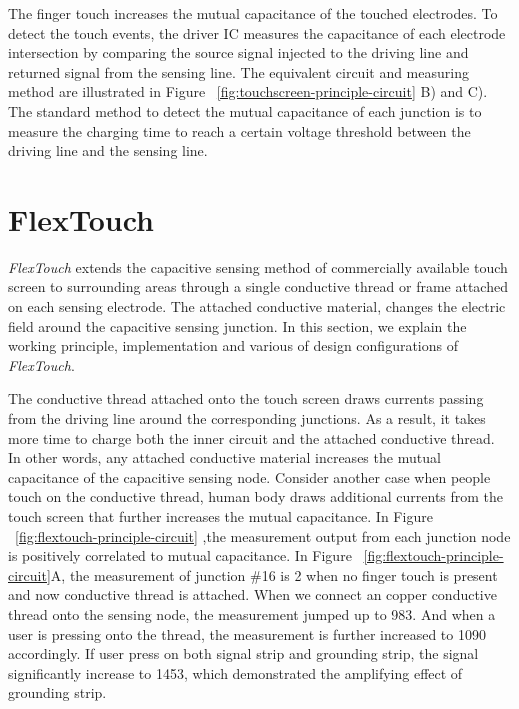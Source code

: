 The finger touch increases the mutual capacitance of the touched electrodes. To detect the touch events, the driver IC measures the capacitance of each electrode intersection by comparing the source signal injected to the driving line and returned signal from the sensing line. The equivalent circuit and measuring method are illustrated in Figure ~\ref{fig:touchscreen-principle-circuit} B) and C). The standard method to detect the mutual capacitance of each junction is to measure the charging time to reach a certain voltage threshold between the driving line and the sensing line. 

\section{FlexTouch}

\textit{FlexTouch} extends the capacitive sensing method of commercially available touch screen to surrounding areas through a single conductive thread or frame attached on each sensing electrode. The attached conductive material, changes the electric field around the capacitive sensing junction. In this section, we explain the working principle, implementation and various of design configurations of \textit{FlexTouch}.

The conductive thread attached onto the touch screen draws currents passing from the driving line around the corresponding junctions. As a result, it takes more time to charge both the inner circuit and the attached conductive thread. In other words, any attached conductive material increases the mutual capacitance of the capacitive sensing node. Consider another case when people touch on the conductive thread, human body draws additional currents from the touch screen that further increases the mutual capacitance. In Figure ~\ref{fig:flextouch-principle-circuit} ,the measurement output from each junction node is positively correlated to mutual capacitance. In Figure  ~\ref{fig:flextouch-principle-circuit}A, the measurement of junction \#16 is 2 when no finger touch is present and now conductive thread is attached. When we connect an copper conductive thread onto the sensing node, the measurement jumped up to 983. And when a user is pressing onto the thread, the measurement is further increased to 1090 accordingly. If user press on both signal strip and grounding strip, the signal significantly increase to 1453, which demonstrated the amplifying effect of grounding strip.

